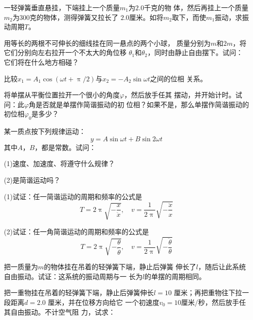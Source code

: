 \begin{exercises}

\exercise 一轻弹簧垂直悬挂，下端挂上一个质量$ m _ 1 $为$ 2.0 $千克的物
体，然后再挂上一个质量$ m _ 2 $为$ 300 $克的物体，测得弹簧又拉长了
$ 2.0 $厘米。如将$ m _ 2 $取下，而使$  m _ { 1 } $振动，求振动周期$ T $。

\exercise 用等长的两根不可伸长的细线挂在同一悬点的两个小球，
质量分别为$ m $和$ 2m $，将它们分别向左右拉开一个不太大的角位移
$ \theta _ { 1 } $和$ \theta _ { 2 } $，同时由静止自由摆下。试问：它们将在什么地方相碰？

\exercise 比较$ x _ { 1 } = A _ { 1 } \cos \left( \omega t + \uppi / 2 \right) $与$ x _ { 2 } = - A _ { 2 } \sin \omega t $之间的位相
关系。

\exercise 将单摆从平衡位置拉开一个很小的角度$ \varphi $，然后放手任其
摆动，并开始计时。试问：此$ \varphi $角是否就是单摆作简谐振动的初
位相？如果不是，那么单摆作简谐振动的初位相$ \varphi _ { 0 } $是多少？

\exercise 某一质点按下列规律运动：
\begin{equation*}
    y = A \sin \omega t + B \sin 2 \omega t
\end{equation*}
其中$ A $，$ B $，都是常数。试问：

(1)速度、加速度、将遵守什么规律？

(2)是简谐运动吗？

\exercise (1)试证：任一简谐运动的周期和频率的公式是
\begin{equation*}
    T = 2 \uppi \sqrt { - \frac { x } { \ddot { x } } } , \quad v = \frac { 1 } { 2 \uppi } \sqrt { - \frac { \ddot { x } } { x } }
\end{equation*}

(2)试证：任一角简谐运动的周期和频率的公式是
\begin{equation*}
    T = 2 \uppi \sqrt { - \frac { \theta } { \ddot { \theta } } } , \quad v = \frac { 1 } { 2 \uppi } \sqrt { - \frac { \ddot { \theta } } { \theta } }
\end{equation*}

\exercise 把一质量为$ m $的物体挂在吊着的轻弹簧下端，静止后弹簧
伸长了$ l $，随后让此系统自由振动。试证：这系统的振动周期与一
长为$ l $的单摆的周期相同。

\exercise 把一重物挂在吊着的轻弹簧下端，静止后弹簧伸长$ l = 10 $
厘米；再把重物往下拉一段距离$ d = 2.0 $ 厘米，并在位移方向给它
一个初速度$ v _ { 0 } = 10 $厘米/秒，然后放手任其自由振动。不计空气阻
力，试求：


\end{exercises}
